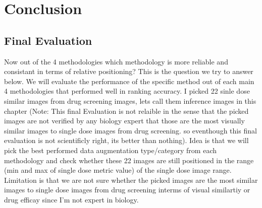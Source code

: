 \chapter{Conclusion}

\section{Final Evaluation}
Now out of the 4 methodologies which methodology is more reliable and consistant in terms of relative positioning? This is the question we try to answer below.
We will evaluate the performance of the specific method out of each main 4 methodologies that performed well in ranking accuracy.
I picked 22 sinle dose  similar images from drug screening images, lets call them inference images in this chapter (Note: This final Evaluation is not relaible in the sense that the picked images are not verified by any biology expert that those are the most visually similar images to single dose images from drug screening. so eventhough this final evaluation is not scientificly right, its better than nothing). Idea is that we will pick the best performed data augmentation type/category from each methodology and check whether these 22 images are still positioned in the range (min and max of single dose metric value) of the single dose image range. Limitation is that we are not sure whether the picked images are the most similar images to single dose images from drug screening interms of visual similartiy or drug efficay since I'm not expert in biology.

